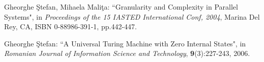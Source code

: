 {\begin{thebibliography}{}

  Gheorghe \c Stefan, Mihaela Mali\c ta: ``Granularity and Complexity in Parallel Systems", in {\em Proceedings of the 15 IASTED International Conf, 2004}, Marina Del Rey, CA, ISBN 0-88986-391-1, pp.442-447.


  Gheorghe \c Stefan: ``A Universal Turing Machine with Zero Internal
States", in {\em Romanian Journal of Information Science and
Technology}, {\bf 9}(3):227-243,  2006.








\end{thebibliography}}
